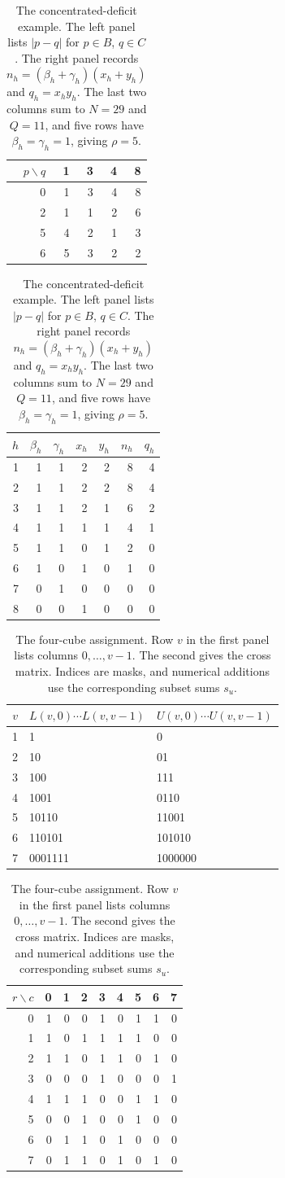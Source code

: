 \documentclass[11pt,a4paper]{article}
\theoremstyle{definition}
\numberwithin{equation}{section}
\begin{document}
\begin{table}[!htbp]
		\centering
		\caption{The concentrated-deficit example. The left panel lists $|p-q|$ for $p\in B$, $q\in C$. The right panel records $n_h=(\beta_h+\gamma_h)(x_h+y_h)$ and $q_h=x_hy_h$. The last two columns sum to $N=29$ and $Q=11$, and five rows have $\beta_h=\gamma_h=1$, giving $\rho=5$.}
		\label{tab:deficit}
		\begin{tabular}{@{}rrrrr@{}}
			\toprule $p\backslash q$&1&3&4&8\\\midrule
			0&1&3&4&8\\2&1&1&2&6\\5&4&2&1&3\\6&5&3&2&2\\\bottomrule
		\end{tabular}\qquad
		\begin{tabular}{@{}rrrrrrr@{}}
			\toprule $h$&$\beta_h$&$\gamma_h$&$x_h$&$y_h$&$n_h$&$q_h$\\\midrule
			1&1&1&2&2&8&4\\2&1&1&2&2&8&4\\3&1&1&2&1&6&2\\4&1&1&1&1&4&1\\5&1&1&0&1&2&0\\6&1&0&1&0&1&0\\7&0&1&0&0&0&0\\8&0&0&1&0&0&0\\\bottomrule
		\end{tabular}
	\end{table}

\begin{table}[!htbp]
		\centering
		\caption{The four-cube assignment. Row $v$ in the first panel lists columns $0,\ldots,v-1$. The second gives the cross matrix. Indices are masks, and numerical additions use the corresponding subset sums $s_u$.}
		\label{tab:fourcube}
		\begin{tabular}{@{}rll@{}}
			\toprule $v$&$L(v,0)\cdots L(v,v-1)$&$U(v,0)\cdots U(v,v-1)$\\\midrule
			1&1&0\\2&10&01\\3&100&111\\4&1001&0110\\5&10110&11001\\6&110101&101010\\7&0001111&1000000\\\bottomrule
		\end{tabular}\quad
		\begin{tabular}{@{}r*{8}{r}@{}}
			\toprule $r\backslash c$&0&1&2&3&4&5&6&7\\\midrule
			0&1&0&0&1&0&1&1&0\\1&1&0&1&1&1&1&0&0\\2&1&1&0&1&1&0&1&0\\3&0&0&0&1&0&0&0&1\\4&1&1&1&0&0&1&1&0\\5&0&0&1&0&0&1&0&0\\6&0&1&1&0&1&0&0&0\\7&0&1&1&0&1&0&1&0\\\bottomrule
		\end{tabular}
	\end{table}
\end{document}
